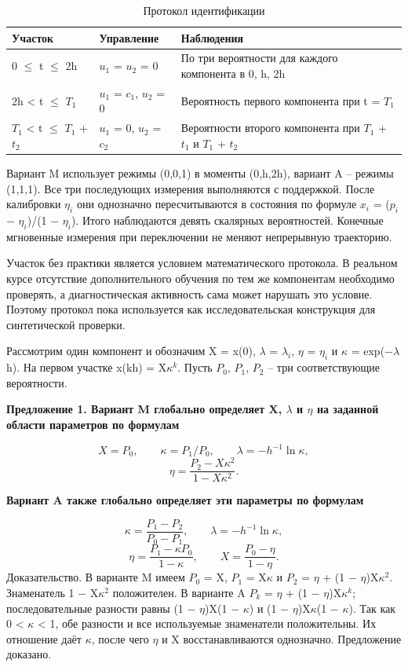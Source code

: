 \documentclass[blind]{psta}
\begin{document}
\begin{table}[htbp]
\caption{Протокол идентификации}
\label{tab:22}
\centering\small
\renewcommand{\arraystretch}{1.25}
\setlength{\tabcolsep}{3pt}
\begin{tabular}{|p{.20\linewidth}|p{.22\linewidth}|p{.47\linewidth}|}
\hline
\textbf{Участок} & \textbf{Управление} & \textbf{Наблюдения}\\\hline
0 $\le$ t $\le$ 2h & $u_{1}$ = $u_{2}$ = 0 & По три вероятности для каждого компонента в 0, h, 2h\\\hline
2h < t $\le$ $T_{1}$ & $u_{1}$ = $c_{1}$, $u_{2}$ = 0 & Вероятность первого компонента при t = $T_{1}$\\\hline
$T_{1}$ < t $\le$ $T_{1}$ + $t_{2}$ & $u_{1}$ = 0, $u_{2}$ = $c_{2}$ & Вероятности второго компонента при $T_{1}$ + $t_{1}$ и $T_{1}$ + $t_{2}$\\\hline
\end{tabular}
\end{table}
Вариант M использует режимы (0,0,1) в моменты (0,h,2h), вариант A – режимы (1,1,1). Все три последующих измерения выполняются с поддержкой. После калибровки $\eta_{i}$ они однозначно пересчитываются в состояния по формуле $x_{i}$ = ($p_{i}$ $-$ $\eta_{i}$)/(1 $-$ $\eta_{i}$). Итого наблюдаются девять скалярных вероятностей. Конечные мгновенные измерения при переключении не меняют непрерывную траекторию.

Участок без практики является условием математического протокола. В реальном курсе отсутствие дополнительного обучения по тем же компонентам необходимо проверять, а диагностическая активность сама может нарушать это условие. Поэтому протокол пока используется как исследовательская конструкция для синтетической проверки.

Рассмотрим один компонент и обозначим X = x(0), $\lambda$ = $\lambda_{i}$, $\eta$ = $\eta_{i}$ и $\kappa$ = exp($-$$\lambda$h). На первом участке x(kh) = X$\kappa$$^{k}$. Пусть $P_{0}$, $P_{1}$, $P_{2}$ – три соответствующие вероятности.

\par\medskip\noindent\textbf{Предложение 1. Вариант M глобально определяет X, $\lambda$ и $\eta$ на заданной области параметров по формулам}\par\smallskip
\[
X=P_0,\qquad \kappa =P_1/P_0,\qquad \lambda=-h^{-1}\ln \kappa ,
\]
\[
\eta=\frac{P_2-X\kappa ^2}{1-X\kappa ^2}.
\]
\par\medskip\noindent\textbf{Вариант A также глобально определяет эти параметры по формулам}\par\smallskip
\[
\kappa =\frac{P_1-P_2}{P_0-P_1},\qquad \lambda=-h^{-1}\ln \kappa ,
\]
\[
\eta=\frac{P_1-\kappa P_0}{1-\kappa },\qquad X=\frac{P_0-\eta}{1-\eta}.
\]
Доказательство. В варианте M имеем $P_{0}$ = X, $P_{1}$ = X$\kappa$ и $P_{2}$ = $\eta$ + (1 $-$ $\eta$)X$\kappa$$^{2}$. Знаменатель 1 $-$ X$\kappa$$^{2}$ положителен. В варианте A $P_{k}$ = $\eta$ + (1 $-$ $\eta$)X$\kappa$$^{k}$; последовательные разности равны (1 $-$ $\eta$)X(1 $-$ $\kappa$) и (1 $-$ $\eta$)X$\kappa$(1 $-$ $\kappa$). Так как 0 < $\kappa$ < 1, обе разности и все используемые знаменатели положительны. Их отношение даёт $\kappa$, после чего $\eta$ и X восстанавливаются однозначно. Предложение доказано.
\end{document}
